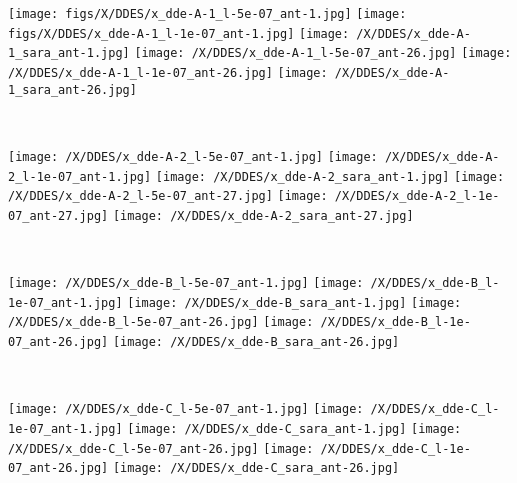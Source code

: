 \begin{figure*}
\begin{minipage}[t]{1\linewidth}
\centering
\texttt{[image: figs/X/DDES/x\_dde-A-1\_l-5e-07\_ant-1.jpg]}
\texttt{[image: figs/X/DDES/x\_dde-A-1\_l-1e-07\_ant-1.jpg]}
\texttt{[image: /X/DDES/x\_dde-A-1\_sara\_ant-1.jpg]}
\texttt{[image: /X/DDES/x\_dde-A-1\_l-5e-07\_ant-26.jpg]}
\texttt{[image: /X/DDES/x\_dde-A-1\_l-1e-07\_ant-26.jpg]}
\texttt{[image: /X/DDES/x\_dde-A-1\_sara\_ant-26.jpg]}
\end{minipage}
~\\
\begin{minipage}[t]{1\linewidth}
\centering
\texttt{[image: /X/DDES/x\_dde-A-2\_l-5e-07\_ant-1.jpg]}
\texttt{[image: /X/DDES/x\_dde-A-2\_l-1e-07\_ant-1.jpg]}
\texttt{[image: /X/DDES/x\_dde-A-2\_sara\_ant-1.jpg]}
\texttt{[image: /X/DDES/x\_dde-A-2\_l-5e-07\_ant-27.jpg]}
\texttt{[image: /X/DDES/x\_dde-A-2\_l-1e-07\_ant-27.jpg]}
\texttt{[image: /X/DDES/x\_dde-A-2\_sara\_ant-27.jpg]}
\end{minipage}
~\\
\begin{minipage}[t]{1\linewidth}\centering
\texttt{[image: /X/DDES/x\_dde-B\_l-5e-07\_ant-1.jpg]}
\texttt{[image: /X/DDES/x\_dde-B\_l-1e-07\_ant-1.jpg]}
\texttt{[image: /X/DDES/x\_dde-B\_sara\_ant-1.jpg]}
\texttt{[image: /X/DDES/x\_dde-B\_l-5e-07\_ant-26.jpg]}
\texttt{[image: /X/DDES/x\_dde-B\_l-1e-07\_ant-26.jpg]}
\texttt{[image: /X/DDES/x\_dde-B\_sara\_ant-26.jpg]}
\end{minipage}
~\\
\begin{minipage}[t]{1\linewidth}\centering
\texttt{[image: /X/DDES/x\_dde-C\_l-5e-07\_ant-1.jpg]}
\texttt{[image: /X/DDES/x\_dde-C\_l-1e-07\_ant-1.jpg]}
\texttt{[image: /X/DDES/x\_dde-C\_sara\_ant-1.jpg]}
\texttt{[image: /X/DDES/x\_dde-C\_l-5e-07\_ant-26.jpg]}
\texttt{[image: /X/DDES/x\_dde-C\_l-1e-07\_ant-26.jpg]}
\texttt{[image: /X/DDES/x\_dde-C\_sara\_ant-26.jpg]}
\end{minipage}
~\\
\begin{minipage}[t]{1\linewidth}\centering

\end{minipage}
\end{figure*}
